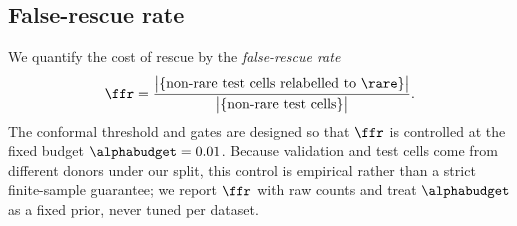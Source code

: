 \subsection{False-rescue rate}
\label{sec:method-ffr}

We quantify the cost of rescue by the \emph{false-rescue rate}
\[
\ffr =
\frac{\big|\{\text{non-rare test cells relabelled to }\rare\}\big|}
{\big|\{\text{non-rare test cells}\}\big|}.
\]
The conformal threshold and gates are designed so that $\ffr$ is controlled at the fixed budget $\alphabudget=0.01$.
Because validation and test cells come from different donors under our split, this control is empirical rather than a
strict finite-sample guarantee; we report $\ffr$ with raw counts and treat $\alphabudget$ as a fixed prior, never
tuned per dataset.
